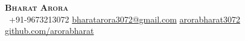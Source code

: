 \begin{center}
    \textbf{\Huge \scshape Bharat Arora} \\ \vspace{10pt}
     \ \small +91-9673213072 \qquad
    \href{mailto:fibharatarora3072stlast@gmail.com}{ bharatarora3072@gmail.com} \qquad
    \href{https://www.linkedin.com/in/arorabharat3072}{ arorabharat3072} \qquad
    \href{https://github.com/arorabharat}{ github.com/arorabharat}
\end{center}